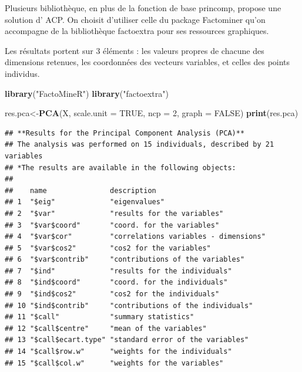 \documentclass[
]{book}
\newenvironment{Shaded}{\begin{snugshade}}{\end{snugshade}}
\newcommand{\DataTypeTok}[1]{\textcolor[rgb]{0.13,0.29,0.53}{#1}}
\newcommand{\DecValTok}[1]{\textcolor[rgb]{0.00,0.00,0.81}{#1}}
\newcommand{\KeywordTok}[1]{\textcolor[rgb]{0.13,0.29,0.53}{\textbf{#1}}}
\newcommand{\NormalTok}[1]{#1}
\newcommand{\OperatorTok}[1]{\textcolor[rgb]{0.81,0.36,0.00}{\textbf{#1}}}
\newcommand{\OtherTok}[1]{\textcolor[rgb]{0.56,0.35,0.01}{#1}}
\newcommand{\StringTok}[1]{\textcolor[rgb]{0.31,0.60,0.02}{#1}}
\begin{document}
Plusieurs bibliothèque, en plus de la fonction de base princomp, propose une solution d' ACP. On choisit d'utiliser celle du package Factominer qu'on accompagne de la bibliothèque factoextra pour ses ressources graphiques.

Les résultats portent sur 3 éléments : les valeurs propres de chacune des dimensions retenues, les coordonnées des vecteurs variables, et celles des points individus.

\begin{Shaded}
\begin{Highlighting}[]
\KeywordTok{library}\NormalTok{(}\StringTok{"FactoMineR"}\NormalTok{)}
\KeywordTok{library}\NormalTok{(}\StringTok{"factoextra"}\NormalTok{)}

\NormalTok{res.pca<-}\KeywordTok{PCA}\NormalTok{(X, }\DataTypeTok{scale.unit =} \OtherTok{TRUE}\NormalTok{, }\DataTypeTok{ncp =} \DecValTok{2}\NormalTok{, }\DataTypeTok{graph =} \OtherTok{FALSE}\NormalTok{)}
\KeywordTok{print}\NormalTok{(res.pca)}
\end{Highlighting}
\end{Shaded}

\begin{verbatim}
## **Results for the Principal Component Analysis (PCA)**
## The analysis was performed on 15 individuals, described by 21 variables
## *The results are available in the following objects:
## 
##    name               description                          
## 1  "$eig"             "eigenvalues"                        
## 2  "$var"             "results for the variables"          
## 3  "$var$coord"       "coord. for the variables"           
## 4  "$var$cor"         "correlations variables - dimensions"
## 5  "$var$cos2"        "cos2 for the variables"             
## 6  "$var$contrib"     "contributions of the variables"     
## 7  "$ind"             "results for the individuals"        
## 8  "$ind$coord"       "coord. for the individuals"         
## 9  "$ind$cos2"        "cos2 for the individuals"           
## 10 "$ind$contrib"     "contributions of the individuals"   
## 11 "$call"            "summary statistics"                 
## 12 "$call$centre"     "mean of the variables"              
## 13 "$call$ecart.type" "standard error of the variables"    
## 14 "$call$row.w"      "weights for the individuals"        
## 15 "$call$col.w"      "weights for the variables"
\end{verbatim}

\begin{Shaded}
\end{Shaded}
\end{document}
